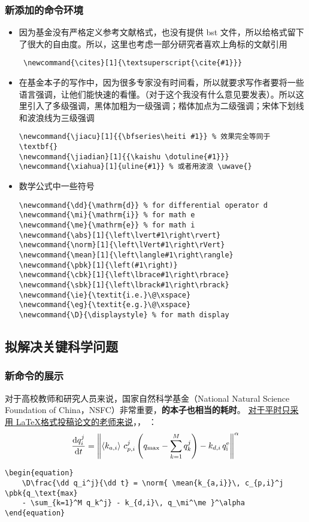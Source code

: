 \documentclass[a4paper]{article}
\begin{document}
{\subsubsection{新添加的命令环境}
\begin{itemize}
    \item 因为基金没有严格定义参考文献格式，也没有提供 bst 文件，所以给格式留下了很大的自由度。所以，这里也考虑一部分研究者喜欢上角标的文献引用 \begin{verbatim} \newcommand{\cites}[1]{\textsuperscript{\cite{#1}}} \end{verbatim}
    \item 在基金本子的写作中，因为很多专家没有时间看，所以就要求写作者要将一些语言强调，让他们能快速的看懂。（对于这个我没有什么意见要发表）。所以这里引入了多级强调，黑体加粗为一级强调；楷体加点为二级强调；宋体下划线和波浪线为三级强调
\begin{verbatim}
\newcommand{\jiacu}[1]{{\bfseries\heiti #1}} % 效果完全等同于 \textbf{}
\newcommand{\jiadian}[1]{{\kaishu \dotuline{#1}}}
\newcommand{\xiahua}[1]{uline{#1}} % 或者用波浪 \uwave{}
\end{verbatim}
    \item 数学公式中一些符号
\begin{verbatim}
\newcommand{\dd}{\mathrm{d}} % for differential operator d
\newcommand{\mi}{\mathrm{i}} % for math e
\newcommand{\me}{\mathrm{e}} % for math i
\newcommand{\abs}[1]{\left\lvert#1\right\rvert}
\newcommand{\norm}[1]{\left\lVert#1\right\rVert}
\newcommand{\mean}[1]{\left\langle#1\right\rangle}
\newcommand{\pbk}[1]{\left(#1\right)}
\newcommand{\cbk}[1]{\left\lbrace#1\right\rbrace}
\newcommand{\sbk}[1]{\left\lbrack#1\right\rbrack}
\newcommand{\ie}{\textit{i.e.}\@\xspace}
\newcommand{\eg}{\textit{e.g.}\@\xspace}
\newcommand{\D}{\displaystyle} % for math display
\end{verbatim}
\end{itemize}
\subsection{拟解决关键科学问题}
\subsubsection{新命令的展示}
对于高校教师和研究人员来说，国家自然科学基金（National Natural Science Foundation of China，NSFC）非常重要，\textbf{的本子也相当的耗时}。
\uline{对于平时只采用 \LaTeX 格式投稿论文的老师来说}，， \cites{bengio2013representation}：
\begin{equation}
    \D\frac{\dd q_i^j}{\dd t} = \norm{ \mean{k_{a,i}}\, c_{p,i}^j \pbk{q_\text{max} - \sum_{k=1}^M q_k^j} - k_{d,i}\, q_\mi^\me }^\alpha
\end{equation}
\begin{verbatim}
\begin{equation}
    \D\frac{\dd q_i^j}{\dd t} = \norm{ \mean{k_{a,i}}\, c_{p,i}^j \pbk{q_\text{max} 
    - \sum_{k=1}^M q_k^j} - k_{d,i}\, q_\mi^\me }^\alpha
\end{equation}
\end{verbatim}

}
\end{document}
